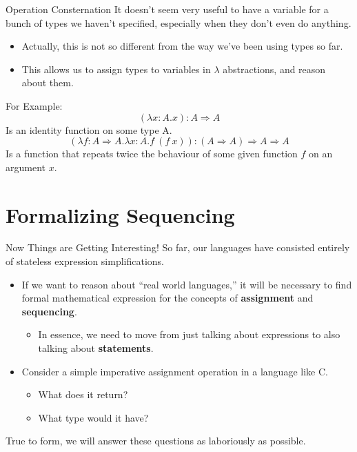 \documentclass[11pt]{beamer}
\begin{document}
\begin{frame}[fragile=singleslide]{Operation Consternation}
It doesn't seem very useful to have a variable for a bunch of types we haven't specified, especially when they don't even do anything.
\begin{itemize}
\item Actually, this is not so different from the way we've been using types so far.  
\item This allows us to assign types to variables in $\lambda$ abstractions, and reason about them.  
\end{itemize}
For Example:
\begin{equation}
(\lambda x:A. x) : A \Rightarrow A
\end{equation}
Is an identity function on some type A.
\begin{equation}
(\lambda f:A\Rightarrow A. \lambda x:A. f\:(f\:x)) : (A \Rightarrow A) \Rightarrow A \Rightarrow A
\end{equation}
Is a function that repeats twice the behaviour of some given function $f$ on an argument $x$.
\end{frame}

\section[Sequencing]{Formalizing Sequencing}
\begin{frame}[fragile=singleslide]{Now Things are Getting Interesting!}
So far, our languages have consisted entirely of stateless expression simplifications. 
\begin{itemize}
\item If we want to reason about ``real world languages,'' it will be necessary to find formal mathematical expression for the concepts of \textbf{assignment} and \textbf{sequencing}.
\begin{itemize}
\item In essence, we need to move from just talking about expressions to also talking about \textbf{statements}.  
\end{itemize}
\item Consider a simple imperative assignment operation in a language like C.
\begin{itemize}
\item What does it return?
\item What type would it have?
\end{itemize}
\end{itemize}
True to form, we will answer these questions as laboriously as possible.  
\end{frame}
\end{document}
